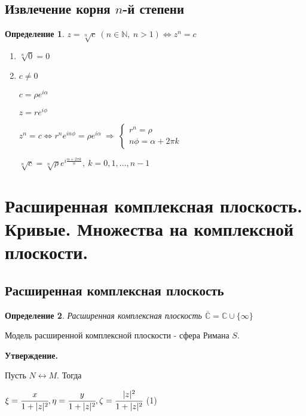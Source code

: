 \documentclass[draft]{report}
\newcommand{\then}{\ \Rightarrow\ }
\renewcommand{\C}{\mathbb{C}}
\newcommand{\N}{\mathbb{N}}
\newcommand{\LRA}{\Leftrightarrow}
\renewcommand{\bar}{\overline}
\newcommand{\opr}[1]{\begin{opred}#1\end{opred}}
\newtheorem*{opred}{Определение}
\theoremstyle{remark}
\begin{document}
\subsection{Извлечение корня $n$-й степени}

\opr{$z=\sqrt[n]{c}\ (n\in\N,\ n>1)\LRA z^n=c$}
\begin{enumerate}
\item$\sqrt[n]{0}=0$
\item$c\neq0$

$c=\rho e^{i\alpha}$

$z=re^{i\phi}$

$z^n=c\LRA r^ne^{in\phi}=\rho e^{i\alpha}\then\left\{\begin{matrix}
r^n=\rho \\
n\phi=\alpha+2\pi k
\end{matrix}\right.$

$\sqrt[n]{c}=\sqrt[n]{\rho}e^{i\frac{\alpha+2\pi k}{n}},\ k=0,1,\ldots,n-1$
\end{enumerate}

\section{Расширенная комплексная плоскость. Кривые. Множества на комплексной плоскости.}

\subsection{Расширенная комплексная плоскость}

\begin{opred}
Расширенная комплексная плоскость $\bar{\C}=\C\cup\{\infty\}$
\end{opred}
Модель расширенной комплексной плоскости - сфера Римана $S$.

{\bfseries Утверждение.}

Пусть $N\leftrightarrow M$. Тогда

$\xi=\cfrac{x}{1+|z|^2}, \eta=\cfrac{y}{1+|z|^2}, \zeta=\cfrac{|z|^2}{1+|z|^2}$ (1)
\end{document}
